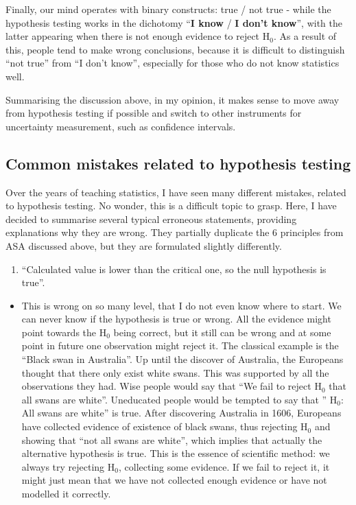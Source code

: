 \documentclass[
]{book}
\providecommand{\tightlist}{%
  \setlength{\itemsep}{0pt}\setlength{\parskip}{0pt}}
\theoremstyle{definition}
\theoremstyle{definition}
\theoremstyle{definition}
\theoremstyle{definition}
\theoremstyle{remark}
\begin{document}
Finally, our mind operates with binary constructs: true / not true - while the hypothesis testing works in the dichotomy ``\textbf{I know} / \textbf{I don't know}'', with the latter appearing when there is not enough evidence to reject \(\mathrm{H}_0\). As a result of this, people tend to make wrong conclusions, because it is difficult to distinguish ``not true'' from ``I don't know'', especially for those who do not know statistics well.

Summarising the discussion above, in my opinion, it makes sense to move away from hypothesis testing if possible and switch to other instruments for uncertainty measurement, such as confidence intervals.

\subsection{Common mistakes related to hypothesis testing}\label{hypothesisTestingMistakes}

Over the years of teaching statistics, I have seen many different mistakes, related to hypothesis testing. No wonder, this is a difficult topic to grasp. Here, I have decided to summarise several typical erroneous statements, providing explanations why they are wrong. They partially duplicate the 6 principles from ASA discussed above, but they are formulated slightly differently.

\begin{enumerate}
\def\labelenumi{\arabic{enumi}.}
\tightlist
\item
  ``Calculated value is lower than the critical one, so the null hypothesis is true''.
\end{enumerate}

\begin{itemize}
\tightlist
\item
  This is wrong on so many level, that I do not even know where to start. We can never know if the hypothesis is true or wrong. All the evidence might point towards the \(\mathrm{H}_0\) being correct, but it still can be wrong and at some point in future one observation might reject it. The classical example is the ``Black swan in Australia''. Up until the discover of Australia, the Europeans thought that there only exist white swans. This was supported by all the observations they had. Wise people would say that ``We fail to reject \(\mathrm{H}_0\) that all swans are white''. Uneducated people would be tempted to say that '' \(\mathrm{H}_0\): All swans are white'' is true. After discovering Australia in 1606, Europeans have collected evidence of existence of black swans, thus rejecting \(\mathrm{H}_0\) and showing that ``not all swans are white'', which implies that actually the alternative hypothesis is true. This is the essence of scientific method: we always try rejecting \(\mathrm{H}_0\), collecting some evidence. If we fail to reject it, it might just mean that we have not collected enough evidence or have not modelled it correctly.
\end{itemize}
\end{document}

